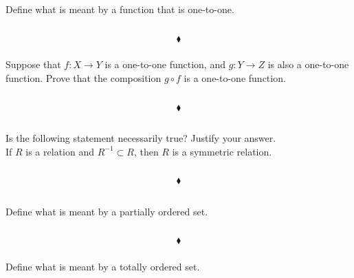 \subsubsection{}
\begin{tcolorbox}
Define what is meant by a function that is one-to-one.
\end{tcolorbox}
$$ $$

$$\blacklozenge$$

\subsubsection{}
\begin{tcolorbox}
Suppose that $f:X\rightarrow Y$ is a one-to-one function, and $g: Y \rightarrow Z$ is also a one-to-one function. Prove that the composition $g \circ f$ is a one-to-one function. 

\end{tcolorbox}
$$ $$

$$\blacklozenge$$


\renewcommand{\thesubsection}{\thesection.\RomanNumeralCaps{9}}
\subsection{}
\begin{tcolorbox}
Is the following statement necessarily true? Justify your answer.\\ If $R$ is a relation and $R^{-1} \subset R$, then $R$ is a symmetric relation. 
\end{tcolorbox}
$$ $$

$$\blacklozenge$$

\renewcommand{\thesubsection}{\thesection.\RomanNumeralCaps{10}}
\subsection{}
\subsubsection{}
\begin{tcolorbox}
Define what is meant by a partially ordered set.
\end{tcolorbox}
$$ $$

$$\blacklozenge$$

\subsubsection{}
\begin{tcolorbox}
Define what is meant by a totally ordered set.
\end{tcolorbox}
$$ $$

